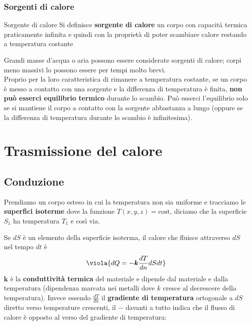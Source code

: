\subsubsection{Sorgenti di calore}
\begin{center}
	\colorbox{yblue}{\begin{minipage}{5.75in}
			\begin{blues}{Sorgente di calore}
				Si definisce \textbf{sorgente di calore} un corpo con capacità termica praticamente infinita e quindi con la proprietà di poter scambiare calore restando a temperatura costante
			\end{blues}
	\end{minipage}}
\end{center}
Grandi masse d'acqua o aria possono essere considerate sorgenti di calore; corpi meno massivi lo possono essere per tempi molto brevi.\\

\noindent
Proprio per la loro caratteristica di rimanere a temperatura costante, se un corpo è messo a contatto con una sorgente e la differenza di temperatura è finita, \textbf{non può esserci equilibrio termico} durante lo scambio. Può esserci l'equilibrio solo se si mantiene il corpo a contatto con la sorgente abbastanza a lungo (oppure se la differenza di temperatura durante lo scambio è infinitesima).


\section{Trasmissione del calore}

\subsection{Conduzione}
Prendiamo un corpo esteso in cui la temperatura non sia uniforme e tracciamo le \textbf{superfici isoterme} dove la funzione \(T(x,y,z) = \text{cost}\), diciamo che la superficie \(S_1\) ha temperatura \(T_1\) e così via. 

Se \(dS\) è un elemento della superficie isoterma, il calore che fluisce attraverso \(dS\) nel tempo \(dt\) è 
\begin{equation}\label{fourier calore}
	\viola{dQ = -\boldsymbol{k} \frac{dT}{dn}dS dt}
\end{equation}
\(\boldsymbol{k}\) è la \textbf{conduttività termica} del materiale e dipende dal materiale e dalla temperatura (dipendenza marcata nei metalli dove \(k\) cresce al decrescere della temperatura). Invece essendo \(\frac{dT}{dn}\) il \textbf{gradiente di temperatura} ortogonale a \(dS\) diretto verso temperature crescenti, il \(\boldsymbol{-}\) davanti a tutto indica che il flusso di calore è opposto al verso del gradiente di temperatura:\\

